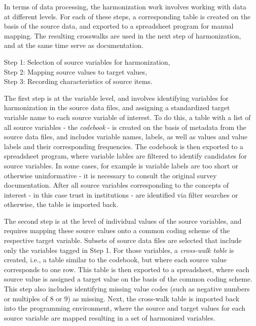 \documentclass[12pt,]{article}
\begin{document}
In terms of data processing, the harmonization work involves working with data at different levels. For each of these steps, a corresponding table is created on the basis of the source data, and exported to a spreadsheet program for manual mapping. The resulting crosswalks are used in the next step of harmonization, and at the same time serve as documentation.

\parindent 0in

Step 1: Selection of source variables for harmonization,\\
Step 2: Mapping source values to target values,\\
Step 3: Recording characteristics of source items.

\parindent 0.5in

The first step is at the variable level, and involves identifying variables for harmonization in the source data files, and assigning a standardized target variable name to each source variable of interest. To do this, a table with a list of all source variables - the \emph{codebook} - is created on the basis of metadata from the source data files, and includes variable names, labels, as well as values and value labels and their corresponding frequencies. The codebook is then exported to a spreadsheet program, where variable lables are filtered to identify candidates for source variables. In some cases, for example is variable labels are too short or otherwise uninformative - it is necessary to consult the original survey documentation. After all source variables corresponding to the concepts of interest - in this case trust in institutions - are identified via filter searches or otherwise, the table is imported back.

The second step is at the level of individual values of the source variables, and requires mapping these source values onto a common coding scheme of the respective target variable. Subsets of source data files are selected that include only the variables tagged in Step 1. For those variables, a \emph{cross-walk table} is created, i.e., a table similar to the codebook, but where each source value corresponds to one row. This table is then exported to a spreadsheet, where each source value is assigned a target value on the basis of the common coding scheme. This step also includes identifying missing value codes (such as negative numbers or multiples of 8 or 9) as missing. Next, the cross-walk table is imported back into the programming environment, where the source and target values for each source variable are mapped resulting in a set of harmonized variables.
\end{document}
